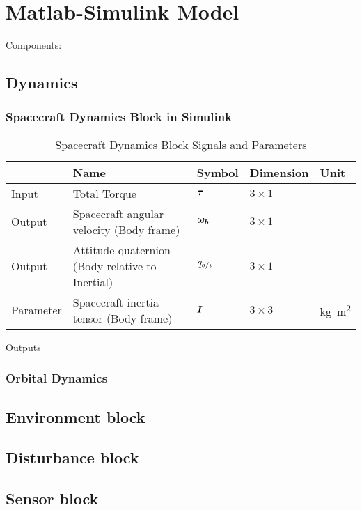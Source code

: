 
\section{Matlab-Simulink Model}
Components:

\subsection{Dynamics}
\subsubsection{Spacecraft Dynamics Block in Simulink} %

\begin{table}[htp]
\caption{Spacecraft Dynamics Block Signals and Parameters \label{tab:sc-dyn-blk}}
\centering
\begin{tabular}{lllll}
\hline
& Name & Symbol & Dimension & Unit \\
\hline
Input & Total Torque & $\boldsymbol{\tau}$ & $3 \times 1$ & \\
Output & Spacecraft angular velocity (Body frame) & $\boldsymbol{\omega_b}$ & $3 \times 1$ & \\
Output & Attitude quaternion (Body relative to Inertial) & $q_{b/i}$ & $3 \times 1$ & \\
Parameter & Spacecraft inertia tensor (Body frame) & $\boldsymbol{I}$ & $3 \times 3$ & \si{kg.m^2} \\

\hline
\end{tabular}
\end{table}%


Outputs

\subsubsection{Orbital Dynamics} %
\subsection{Environment block} %
\subsection{Disturbance block} %
\subsection{Sensor block} %
